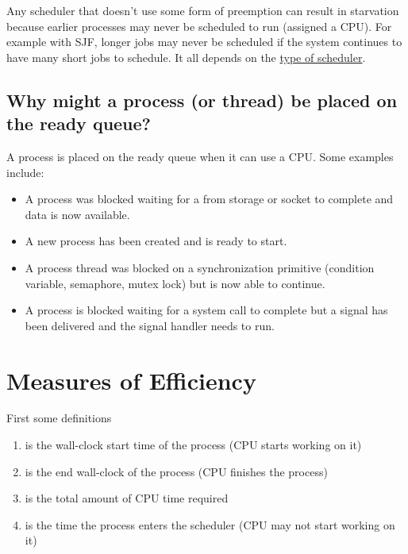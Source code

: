 Any scheduler that doesn't use some form of preemption can result in starvation because earlier processes may never be scheduled to run (assigned a CPU).
For example with SJF, longer jobs may never be scheduled if the system continues to have many short jobs to schedule.
It all depends on the \href{https://en.wikipedia.org/wiki/Scheduling_(computing)\#Types_of_operating_system_schedulers}{type of scheduler}.

\subsection{Why might a process (or thread) be placed on the ready queue?}

A process is placed on the ready queue when it can use a CPU. Some examples include:

\begin{itemize}
  \tightlist
\item A process was blocked waiting for a  from storage or socket to complete and data is now available.
\item A new process has been created and is ready to start.
\item A process thread was blocked on a synchronization primitive (condition variable, semaphore, mutex lock) but is now able to continue.
\item A process is blocked waiting for a system call to complete but a signal has been delivered and the signal handler needs to run.
\end{itemize}

\section{Measures of Efficiency}

First some definitions

\begin{enumerate}
  \item {} is the wall-clock start time of the process (CPU starts working on it)
  \item {} is the end wall-clock of the process (CPU finishes the process)
  \item {} is the total amount of CPU time required
  \item {} is the time the process enters the scheduler (CPU may not start working on it)
\end{enumerate}

